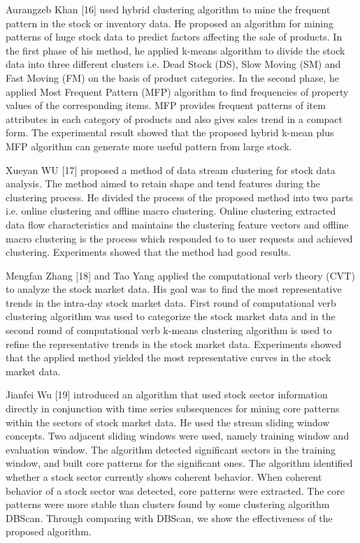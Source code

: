 Aurangzeb  Khan  [16]  used  hybrid  clustering  algorithm  to mine the frequent pattern in the stock or inventory data. He proposed an algorithm for mining patterns of huge stock data to predict factors affecting the sale of products. In the first phase of his method, he applied k-means algorithm to divide the stock data into  three different clusters i.e. Dead Stock (DS), Slow Moving (SM) and Fast Moving (FM) on the basis of product categories. In the second phase, he applied Most Frequent Pattern (MFP) algorithm to find frequencies of property values  of the  corresponding items. MFP  provides frequent  patterns  of  item  attributes  in  each  category  of products and also gives sales trend in a compact form. The experimental result showed that the proposed hybrid k-mean plus MFP algorithm can generate more useful pattern from large stock.

Xueyan WU [17] proposed a method of data stream clustering for stock data analysis. The method aimed to retain shape and tend features during the clustering process. He divided the process of the proposed method into two parts i.e. online clustering and offline macro clustering. Online clustering extracted   data   flow   characteristics   and   maintains   the clustering feature vectors and offline macro clustering is the process which responded to to user requests and achieved clustering. Experiments showed that the method had good results.

Mengfan Zhang [18] and Tao Yang applied the computational verb theory (CVT) to analyze the stock market data. His goal was to find the most representative trends in the intra-day stock   market   data.   First   round   of   computational   verb clustering algorithm was used to categorize the stock market data and in the second round of computational verb k-means clustering algorithm is used to refine the representative trends in the stock market data. Experiments showed that the applied method yielded the most representative curves in the stock market data.

Jianfei Wu [19] introduced an algorithm that used stock sector information directly in conjunction with time series subsequences for mining core patterns within the sectors of stock market data. He used the stream sliding window concepts. Two adjacent sliding windows were used, namely training window and evaluation window. The algorithm detected significant sectors in the training window, and built core patterns for the significant ones. The algorithm identified whether a stock sector currently shows coherent behavior. When coherent behavior of a stock sector was detected, core patterns were extracted. The core patterns were more stable than  clusters found by some clustering algorithm DBScan. Through comparing with DBScan, we show the effectiveness of the proposed algorithm.

